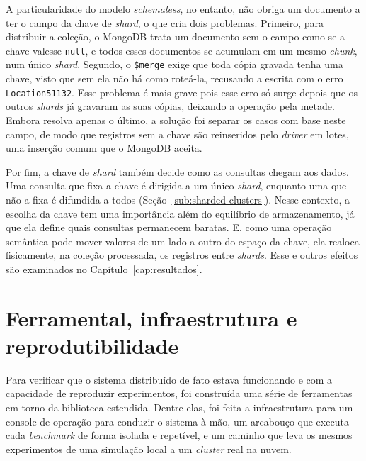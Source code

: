 A particularidade do modelo \textit{schemaless}, no entanto, não obriga um documento a ter o campo da chave de \textit{shard}, o que cria dois problemas. Primeiro, para distribuir a coleção, o MongoDB trata um documento sem o campo como se a chave valesse \texttt{null}, e todos esses documentos se acumulam em um mesmo \textit{chunk}, num único \textit{shard}. Segundo, o \texttt{\$merge} exige que toda cópia gravada tenha uma chave, visto que sem ela não há como roteá-la, recusando a escrita com o erro \texttt{Location51132}. Esse problema é mais grave pois esse erro só surge depois que os outros \textit{shards} já gravaram as suas cópias, deixando a operação pela metade. Embora resolva apenas o último, a solução foi separar os casos com base neste campo, de modo que registros sem a chave são reinseridos pelo \textit{driver} em lotes, uma inserção comum que o MongoDB aceita.

Por fim, a chave de \textit{shard} também decide como as consultas chegam aos dados. Uma consulta que fixa a chave é dirigida a um único \textit{shard}, enquanto uma que não a fixa é difundida a todos (Seção~\ref{sub:sharded-clusters}). Nesse contexto, a escolha da chave tem uma importância além do equilíbrio de armazenamento, já que ela define quais consultas permanecem baratas. E, como uma operação semântica pode mover valores de um lado a outro do espaço da chave, ela realoca fisicamente, na coleção processada, os registros entre \textit{shards}. Esse e outros efeitos são examinados no Capítulo~\ref{cap:resultados}.

\section{Ferramental, infraestrutura e reprodutibilidade}
\label{sec:ferramental}

Para verificar que o sistema distribuído de fato estava funcionando e com a capacidade de reproduzir experimentos, foi construída uma série de ferramentas em torno da biblioteca estendida. Dentre elas, foi feita a infraestrutura para um console de operação para conduzir o sistema à mão, um arcabouço que executa cada \textit{benchmark} de forma isolada e repetível, e um caminho que leva os mesmos experimentos de uma simulação local a um \textit{cluster} real na nuvem.

